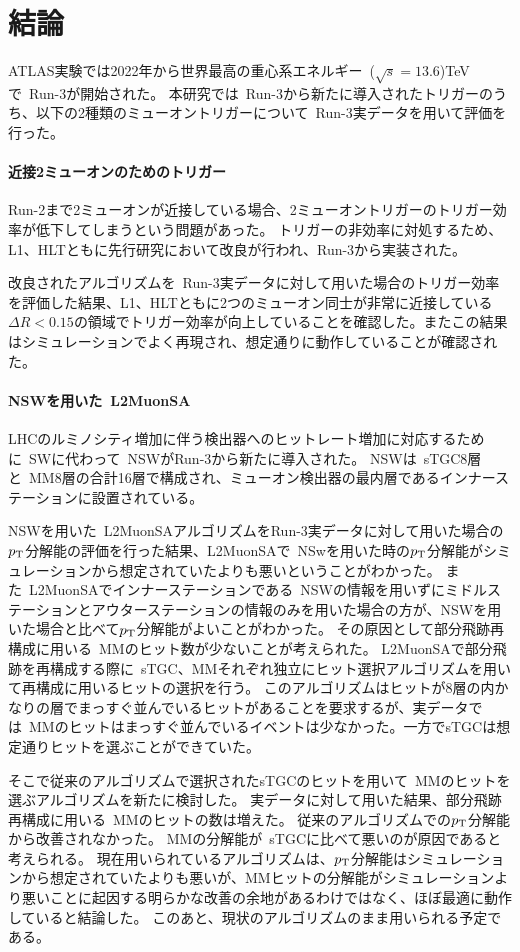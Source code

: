 \chapter{結論}\label{chapter6}
ATLAS実験では2022年から世界最高の重心系エネルギー~($\sqrt{s}=13.6$)TeVで~Run-3が開始された。
本研究では~Run-3から新たに導入されたトリガーのうち、以下の2種類のミューオントリガーについて~Run-3実データを用いて評価を行った。

\subsubsection{近接2ミューオンのためのトリガー}
Run-2まで2ミューオンが近接している場合、2ミューオントリガーのトリガー効率が低下してしまうという問題があった。
トリガーの非効率に対処するため、L1、HLTともに先行研究\cite{article:taniguchi}において改良が行われ、Run-3から実装された。

改良されたアルゴリズムを~Run-3実データに対して用いた場合のトリガー効率を評価した結果、L1、HLTともに2つのミューオン同士が非常に近接している$\Delta R<0.15$の領域でトリガー効率が向上していることを確認した。またこの結果はシミュレーションでよく再現され、想定通りに動作していることが確認された。

\subsubsection{NSWを用いた~L2MuonSA}
LHCのルミノシティ増加に伴う検出器へのヒットレート増加に対応するために~SWに代わって~NSWがRun-3から新たに導入された。
NSWは~sTGC8層と~MM8層の合計16層で構成され、ミューオン検出器の最内層であるインナーステーションに設置されている。

NSWを用いた~L2MuonSAアルゴリズムをRun-3実データに対して用いた場合の$p_\mathrm{T}$分解能の評価を行った結果、L2MuonSAで~NSwを用いた時の$p_\mathrm{T}$分解能がシミュレーションから想定されていたよりも悪いということがわかった。
また~L2MuonSAでインナーステーションである~NSWの情報を用いずにミドルステーションとアウターステーションの情報のみを用いた場合の方が、NSWを用いた場合と比べて$p_\mathrm{T}$分解能がよいことがわかった。
その原因として部分飛跡再構成に用いる~MMのヒット数が少ないことが考えられた。
L2MuonSAで部分飛跡を再構成する際に~sTGC、MMそれぞれ独立にヒット選択アルゴリズムを用いて再構成に用いるヒットの選択を行う。
このアルゴリズムはヒットが8層の内かなりの層でまっすぐ並んでいるヒットがあることを要求するが、実データでは~MMのヒットはまっすぐ並んでいるイベントは少なかった。一方でsTGCは想定通りヒットを選ぶことができていた。

そこで従来のアルゴリズムで選択されたsTGCのヒットを用いて~MMのヒットを選ぶアルゴリズムを新たに検討した。
実データに対して用いた結果、部分飛跡再構成に用いる~MMのヒットの数は増えた。
従来のアルゴリズムでの$p_\mathrm{T}$分解能から改善されなかった。
MMの分解能が~sTGCに比べて悪いのが原因であると考えられる。
現在用いられているアルゴリズムは、$p_\mathrm{T}$分解能はシミュレーションから想定されていたよりも悪いが、MMヒットの分解能がシミュレーションより悪いことに起因する明らかな改善の余地があるわけではなく、ほぼ最適に動作していると結論した。
このあと、現状のアルゴリズムのまま用いられる予定である。